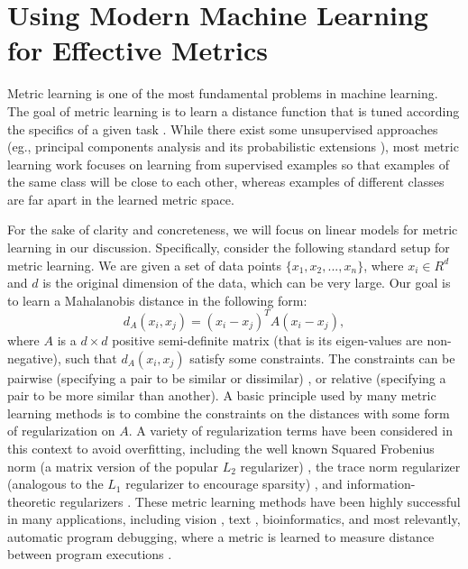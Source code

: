 \section{Using Modern Machine Learning for Effective Metrics}

Metric learning is one of the most fundamental problems in machine
learning. The goal of metric learning is to learn a distance function
that is tuned according the specifics of a given task
\cite{kulis2012metric}. While there exist some unsupervised
approaches (eg., principal components analysis and its probabilistic
extensions \cite{scholkopf1998nonlinear,tipping1999probabilistic,}),
most metric learning work focuses on learning from supervised examples
so that examples of the same class will be close to each other,
whereas examples of different classes are far apart in the learned
metric space.

For the sake of clarity and concreteness, we will focus on linear
models for metric learning in our discussion. Specifically, consider
the following standard setup for metric learning. We are given a set
of data points $\{x_1, x_2, ...,x_n\}$, where $x_i \in R^d$ and $d$ is
the original dimension of the data, which can be very large. Our goal
is to learn a Mahalanobis distance in the following form: \[d_A(x_i,
x_j) = (x_i-x_j)^TA(x_i-x_j),\] where $A$ is a $d\times d$ positive
semi-definite matrix (that is its eigen-values are non-negative), such
that $d_A(x_i, x_j)$ satisfy some constraints. The constraints can be
pairwise (specifying a pair to be similar or dissimilar)
\cite{xing2002distance,bilenko2004integrating,davis2007information},
or relative (specifying a pair to be more similar than
another)\cite{schultz2004learning,rosales2006learning}.  A basic
principle used by many metric learning methods is to combine the
constraints on the distances with some form of regularization on
$A$. A variety of regularization terms have been considered in this
context to avoid overfitting, including the well known Squared
Frobenius norm (a matrix version of the popular $L_2$ regularizer)
\cite{schultz2004learning,kwok2003learning}, the trace norm
regularizer (analogous to the $L_1$ regularizer to encourage sparsity)
\cite{jain2010inductive,}, and information-theoretic regularizers
\cite{davis2007information}. These metric learning methods have been
highly successful in many applications, including vision
\cite{hoi2006learning,frome2007learning,guillaumin2009you}, text
\cite{davis2008structured}, bioinformatics\cite{xiong2006kernel}, and
most relevantly, automatic program debugging, where a metric is
learned to measure distance between program executions
\cite{davis2007information}.

